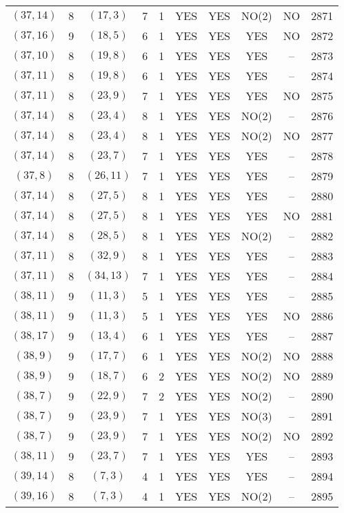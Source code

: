 \begin{longtable}{|c|c|c|c|c|c|c|c|c|c|}
$(37, 14)$ & 8 & $(17, 3)$ & 7 & 1 & YES & YES & NO(2) & NO & 2871\\
$(37, 16)$ & 9 & $(18, 5)$ & 6 & 1 & YES & YES & YES & NO & 2872\\
$(37, 10)$ & 8 & $(19, 8)$ & 6 & 1 & YES & YES & YES & -- & 2873\\
$(37, 11)$ & 8 & $(19, 8)$ & 6 & 1 & YES & YES & YES & -- & 2874\\
$(37, 11)$ & 8 & $(23, 9)$ & 7 & 1 & YES & YES & YES & NO & 2875\\
$(37, 14)$ & 8 & $(23, 4)$ & 8 & 1 & YES & YES & NO(2) & -- & 2876\\
$(37, 14)$ & 8 & $(23, 4)$ & 8 & 1 & YES & YES & NO(2) & NO & 2877\\
$(37, 14)$ & 8 & $(23, 7)$ & 7 & 1 & YES & YES & YES & -- & 2878\\
$(37, 8)$ & 8 & $(26, 11)$ & 7 & 1 & YES & YES & YES & -- & 2879\\
$(37, 14)$ & 8 & $(27, 5)$ & 8 & 1 & YES & YES & YES & -- & 2880\\
$(37, 14)$ & 8 & $(27, 5)$ & 8 & 1 & YES & YES & YES & NO & 2881\\
$(37, 14)$ & 8 & $(28, 5)$ & 8 & 1 & YES & YES & NO(2) & -- & 2882\\
$(37, 11)$ & 8 & $(32, 9)$ & 8 & 1 & YES & YES & YES & -- & 2883\\
$(37, 11)$ & 8 & $(34, 13)$ & 7 & 1 & YES & YES & YES & -- & 2884\\
$(38, 11)$ & 9 & $(11, 3)$ & 5 & 1 & YES & YES & YES & -- & 2885\\
$(38, 11)$ & 9 & $(11, 3)$ & 5 & 1 & YES & YES & YES & NO & 2886\\
$(38, 17)$ & 9 & $(13, 4)$ & 6 & 1 & YES & YES & YES & -- & 2887\\
$(38, 9)$ & 9 & $(17, 7)$ & 6 & 1 & YES & YES & NO(2) & NO & 2888\\
$(38, 9)$ & 9 & $(18, 7)$ & 6 & 2 & YES & YES & NO(2) & NO & 2889\\
$(38, 7)$ & 9 & $(22, 9)$ & 7 & 2 & YES & YES & NO(2) & -- & 2890\\
$(38, 7)$ & 9 & $(23, 9)$ & 7 & 1 & YES & YES & NO(3) & -- & 2891\\
$(38, 7)$ & 9 & $(23, 9)$ & 7 & 1 & YES & YES & NO(2) & NO & 2892\\
$(38, 11)$ & 9 & $(23, 7)$ & 7 & 1 & YES & YES & YES & -- & 2893\\
$(39, 14)$ & 8 & $(7, 3)$ & 4 & 1 & YES & YES & YES & -- & 2894\\
$(39, 16)$ & 8 & $(7, 3)$ & 4 & 1 & YES & YES & NO(2) & -- & 2895\\

\end{longtable}
